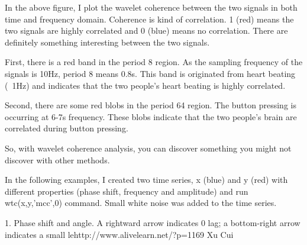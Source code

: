 \documentclass[a4paper,12pt]{article}
\begin{document}
In the above figure, I plot the wavelet coherence between the two signals in both time and frequency domain. Coherence is kind of correlation. 1 (red) means the two signals are highly correlated and 0 (blue) means no correlation. There are definitely something interesting between the two signals.

First, there is a red band in the period 8 region. As the sampling frequency of the signals is 10Hz, period 8 means 0.8s. This band is originated from heart beating (~1Hz) and indicates that the two people’s heart beating is highly correlated.

Second, there are some red blobs in the period 64 region. The button pressing is occurring at 6-7s frequency. These blobs indicate that the two people’s brain are correlated during button pressing.

So, with wavelet coherence analysis, you can discover something you might not discover with other methods.

In the following examples, I created two time series, x (blue) and y (red) with different properties (phase shift, frequency and amplitude) and run wtc(x,y,’mcc’,0) command. Small white noise was added to the time series.

1. Phase shift and angle. A rightward arrow indicates 0 lag; a bottom-right arrow indicates a small lehttp://www.alivelearn.net/?p=1169 Xu Cui
\end{document}
